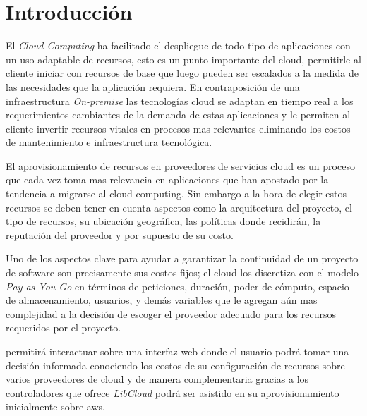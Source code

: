 \begingroup

\chapter{Introducción} %

\label{ch:introduccion} %



El \textit{Cloud Computing} ha facilitado el despliegue de todo tipo de aplicaciones con un uso adaptable de recursos, esto es un punto importante del cloud, permitirle al cliente iniciar con recursos de base que luego pueden ser escalados a la medida de las necesidades que la aplicación requiera. En contraposición de una infraestructura \textit{On-premise} las tecnologías cloud se adaptan en tiempo real a los requerimientos cambiantes de la demanda de estas aplicaciones y le permiten al cliente invertir recursos vitales en procesos mas relevantes eliminando los costos de mantenimiento e infraestructura tecnológica.\bigskip

El aprovisionamiento de recursos en proveedores de servicios cloud es un proceso que cada vez toma mas relevancia en aplicaciones que han apostado por la tendencia a migrarse al cloud computing. Sin embargo a la hora de elegir estos recursos se deben tener en cuenta aspectos como la arquitectura del proyecto, el tipo de recursos, su ubicación geográfica, las políticas donde recidirán, la reputación del proveedor y por supuesto de su costo.\bigskip

Uno de los aspectos clave para ayudar a garantizar la continuidad de un proyecto de software son precisamente sus costos fijos; el cloud los discretiza con el modelo \textit{Pay as You Go} en términos de peticiones, duración, poder de cómputo, espacio de almacenamiento, usuarios, y demás variables que le agregan aún mas complejidad a la decisión de escoger el proveedor adecuado para los recursos requeridos por el proyecto. \bigskip

\appName permitirá interactuar sobre una interfaz web donde el usuario podrá tomar una decisión informada conociendo los costos de su configuración de recursos sobre varios proveedores de cloud y de manera complementaria gracias a los controladores que ofrece \textit{LibCloud} podrá ser asistido en su aprovisionamiento inicialmente sobre \acs{aws}.\bigskip

\endgroup